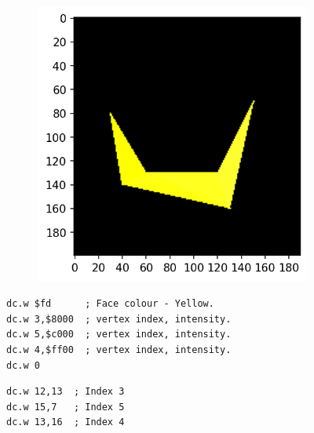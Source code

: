 \begin{figure}[H]
  \centering
  \begin{adjustbox}{width=13cm,center}
    \begin{minipage}[c]{0.48\linewidth}
      \begin{figure}[H]
        \centering
        \begin{adjustbox}{width=5.5cm,center}
          \includegraphics[width=12cm]{src/build_t2k_claws/claw_face_4.png}%
        \end{adjustbox}
      \end{figure}
    \end{minipage}
    \begin{minipage}[c]{0.48\linewidth}
      \begin{lstlisting}[basicstyle=\scriptsize\ttfamily]
dc.w $fd      ; Face colour - Yellow.
dc.w 3,$8000  ; vertex index, intensity.
dc.w 5,$c000  ; vertex index, intensity.
dc.w 4,$ff00  ; vertex index, intensity.
dc.w 0
      \end{lstlisting}
      \begin{lstlisting}[basicstyle=\scriptsize\ttfamily]
dc.w 12,13  ; Index 3
dc.w 15,7   ; Index 5
dc.w 13,16  ; Index 4
      \end{lstlisting}
      \vspace*{\fill}
    \end{minipage}
  \end{adjustbox}
\end{figure}

